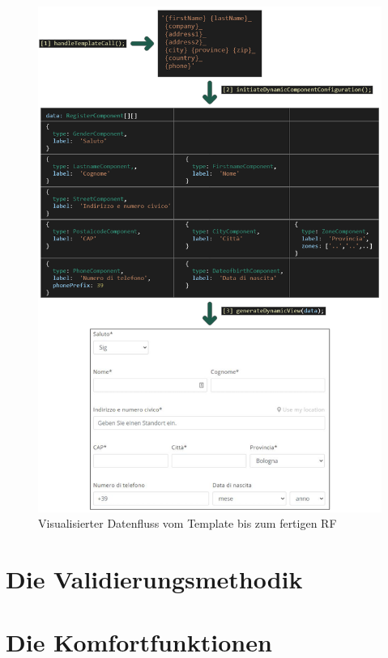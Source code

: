 \begin{figure}[H]
	\centerline{
		\includegraphics[width=1\textwidth, frame]{./grafiken/RF_Datenvisualisierung.png}
	}
	\vskip0pt
	\caption{Visualisierter Datenfluss vom Template bis zum fertigen RF}
\end{figure}

\section{Die Validierungsmethodik}

\section{Die Komfortfunktionen}




